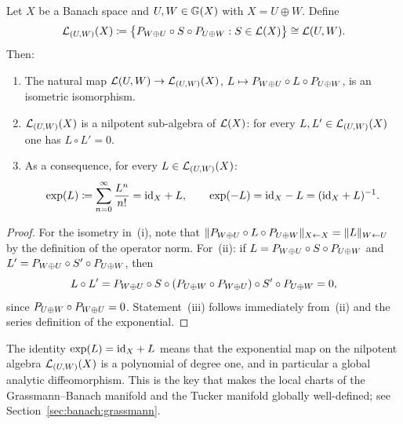 \begin{proposition}
\label{prop:nilpotent_algebra}
Let $X$ be a Banach space and $U, W \in \mathbb{G}(X)$ with $X = U \oplus W$.
Define
\begin{equation*}
    \mathcal{L}_{(U,W)}(X) \coloneqq
    \bigl\{
        P_{W \oplus U} \circ S \circ P_{U \oplus W} : S \in \mathcal{L}(X)
    \bigr\}
    \cong \mathcal{L}(U, W).
\end{equation*}
Then:
\begin{enumerate}
\item[\textup{(i)}] The natural map
    $\mathcal{L}(U, W) \to \mathcal{L}_{(U,W)}(X)$,
    $L \mapsto P_{W \oplus U} \circ L \circ P_{U \oplus W}$,
    is an isometric isomorphism.
\item[\textup{(ii)}] $\mathcal{L}_{(U,W)}(X)$ is a nilpotent sub-algebra of
    $\mathcal{L}(X)$: for every $L, L' \in \mathcal{L}_{(U,W)}(X)$ one has $L \circ L' = 0$.
\item[\textup{(iii)}] As a consequence, for every
    $L \in \mathcal{L}_{(U,W)}(X)$:
    \begin{equation}
    \label{eq:exp_nilpotent}
        \exp(L) \coloneqq \sum_{n=0}^{\infty} \frac{L^n}{n!}
        = \mathrm{id}_{X} + L,
        \qquad
        \exp(-L) = \mathrm{id}_{X} - L = (\mathrm{id}_{X} + L)^{-1}.
    \end{equation}
\end{enumerate}
\end{proposition}

\begin{proof}
For the isometry in~(i), note that
$\|P_{W \oplus U} \circ L \circ P_{U \oplus W}\|_{X \leftarrow X}
= \|L\|_{W \leftarrow U}$ by the definition of the operator norm.
For~(ii): if $L = P_{W \oplus U} \circ S \circ P_{U \oplus W}$ and
$L' = P_{W \oplus U} \circ S' \circ P_{U \oplus W}$, then
\begin{equation*}
    L \circ L' =
    P_{W \oplus U} \circ S \circ (P_{U \oplus W} \circ P_{W \oplus U})
    \circ S' \circ P_{U \oplus W} = 0,
\end{equation*}
since $P_{U \oplus W} \circ P_{W \oplus U} = 0$. Statement~(iii) follows
immediately from~(ii) and the series definition of the exponential.
\end{proof}

The identity $\exp(L) = \mathrm{id}_{X} + L$ means that the exponential map on
the nilpotent algebra $\mathcal{L}_{(U,W)}(X)$ is a polynomial of degree one,
and in particular a global analytic diffeomorphism. This is the key
that makes the local charts of the Grassmann--Banach manifold and the
Tucker manifold globally well-defined; see
Section~\ref{sec:banach:grassmann}.

